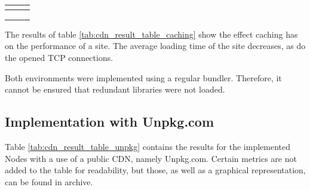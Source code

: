 \begin{longtable}[c]{*{3}{p{\mycolwidth}}}
	&  						   
	&    \\ \midrule
	
	&  						   
	&    \\ \midrule
	
	&  						   
	&    \\ \midrule
	
	&   				  
	&    \\ \bottomrule
	
\end{longtable}

\normalsize
The results of table \ref{tab:cdn_result_table_caching} show the effect caching has on the performance of a site. 
The average loading time of the site decreases, as do the opened TCP connections.

Both environments were implemented using a regular bundler. Therefore, it cannot be ensured that redundant libraries were not loaded.

\subsection{Implementation with Unpkg.com}

Table \ref{tab:cdn_result_table_unpkg} contains the results for the implemented Nodes with a use of a public CDN, namely Unpkg.com. 
Certain metrics are not added to the table for readability, but those, as well as a graphical representation, can be found in archive. 

\scriptsize
\setlength{\mycolwidth}{\dimexpr \textwidth/5 - 2\tabcolsep}

